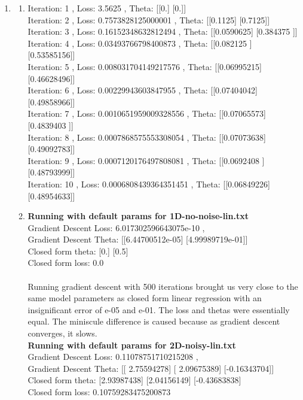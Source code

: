 \documentclass[12pt]{article}
\begin{document}
\begin{enumerate}
\item 
\begin{enumerate}
	\item {Iteration: 1 , Loss: 3.5625 , Theta: [[0.] [0.]]
   \\ Iteration: 2 , Loss: 0.7573828125000001 , Theta: [[0.1125] [0.7125]]
   \\ Iteration: 3 , Loss: 0.16152348632812494 , Theta: [[0.0590625] [0.384375 ]]
   \\ Iteration: 4 , Loss: 0.03493766798400873 , Theta: [[0.082125  ] [0.53585156]]
	\\ Iteration: 5 , Loss: 0.008031704149217576 , Theta: [[0.06995215] [0.46628496]]
	\\ Iteration: 6 , Loss: 0.00229943603847955 , Theta: [[0.07404042] [0.49858966]]
	\\ Iteration: 7 , Loss: 0.0010651959009328556 , Theta: [[0.07065573] [0.4839403 ]]
	\\ Iteration: 8 , Loss: 0.0007868575553308054 , Theta: [[0.07073638] [0.49092783]]
	\\ Iteration: 9 , Loss: 0.0007120176497808081 , Theta: [[0.0692408 ] [0.48793999]]
	\\ Iteration: 10 , Loss: 0.0006808439364351451 , Theta: [[0.06849226] [0.48954633]]}
	\item \textbf{Running with default params for 1D-no-noise-lin.txt}
	\\ Gradient Descent Loss: 6.017302596643075e-10 , 
	\\ Gradient Descent Theta: [[6.44700512e-05] [4.99989719e-01]]
	\\ Closed form theta: [0.] [0.5]
	\\ Closed form loss: 0.0
	\\ \\ Running gradient descent with 500 iterations brought us very close to the same model parameters as closed form linear regression with an insignificant error of e-05 and e-01. The loss and thetas were essentially equal. The miniscule difference is caused because as gradient descent converges, it slows. 
	\\ \textbf{Running with default params for 2D-noisy-lin.txt}
	\\ Gradient Descent Loss: 0.11078751710215208 , 
	\\ Gradient Descent Theta: [[ 2.75594278] [ 2.09675389] [-0.16343704]]
	\\ Closed form theta: [2.93987438] [2.04156149] [-0.43683838]
	\\ Closed form loss: 0.10759283475200873

\end{enumerate}
\end{enumerate}
\end{document}
